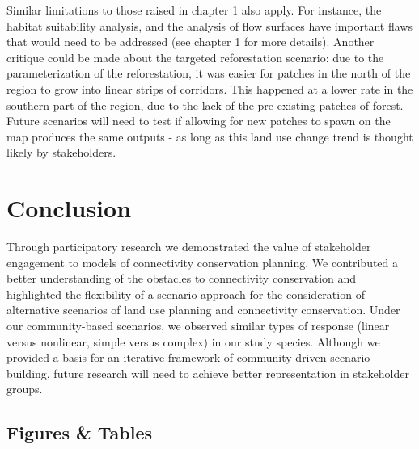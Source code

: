{Similar limitations to those raised in chapter 1 also apply. For instance, the habitat suitability analysis, and the analysis of flow surfaces have important flaws that would need to be addressed (see chapter 1 for more details). Another critique could be made about the targeted reforestation scenario: due to the parameterization of the reforestation, it was easier for patches in the north of the region to grow into linear strips of corridors. This happened at a lower rate in the southern part of the region, due to the lack of the pre-existing patches of forest. Future scenarios will need to test if allowing for new patches to spawn on the map produces the same outputs - as long as this land use change trend is thought likely by stakeholders. \\

\section{Conclusion}

Through participatory research we demonstrated the value of stakeholder engagement to models of connectivity conservation planning. We contributed a better understanding of the obstacles to connectivity conservation and highlighted the flexibility of a scenario approach for the consideration of alternative scenarios of land use planning and connectivity conservation. Under our community-based scenarios, we observed similar types of response (linear versus nonlinear, simple versus complex) in our study species. Although we provided a basis for an iterative framework of community-driven scenario building, future research will need to achieve better representation in stakeholder groups. 


\newpage
\begin{center}
\section*{Figures \& Tables}
\end{center}



}
